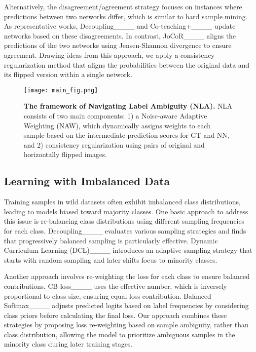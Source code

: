 Alternatively, the disagreement/agreement strategy focuses on instances where predictions between two networks differ, which is similar to hard sample mining. 
As representative works, Decoupling____ and Co-teaching+____ update networks based on these disagreements. In contrast, JoCoR____ aligns the predictions of the two networks using Jensen-Shannon divergence to ensure agreement. Drawing ideas from this approach, we apply a consistency regularization method that aligns the probabilities between the original data and its flipped version within a single network.

\begin{figure*}[htb!]
    \centerline{\texttt{[image: main\_fig.png]}}
    \caption{\textbf{The framework of Navigating Label Ambiguity (NLA).} 
    NLA consists of two main components: 1) a Noise-aware Adaptive Weighting (NAW), which dynamically assigns weights to each sample based on the intermediate prediction scores for GT and NN, and 2) consistency regularization using pairs of original and horizontally flipped images.}
    \label{fig:main}
\end{figure*}

\subsection{Learning with Imbalanced Data}
Training samples in wild datasets often exhibit imbalanced class distributions, leading to models biased toward majority classes. One basic approach to address this issue is re-balancing class distributions using different sampling frequencies for each class. Decoupling____ evaluates various sampling strategies and finds that progressively balanced sampling is particularly effective. Dynamic Curriculum Learning (DCL)____ introduces an adaptive sampling strategy that starts with random sampling and later shifts focus to minority classes.

Another approach involves re-weighting the loss for each class to ensure balanced contributions. CB loss____ uses the effective number, which is inversely proportional to class size, ensuring equal loss contribution. Balanced Softmax____ adjusts predicted logits based on label frequencies by considering class priors before calculating the final loss. Our approach combines these strategies by proposing loss re-weighting based on sample ambiguity, rather than class distribution, allowing the model to prioritize ambiguous samples in the minority class during later training stages.